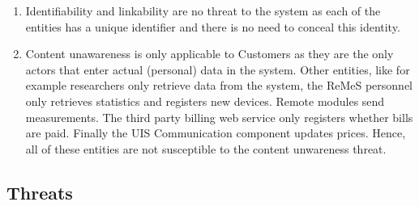 \begin{enumerate}
  \item Identifiability and linkability are no threat to the system as each
  of the entities has a unique identifier and there is no need to conceal this
  identity. 
  \item Content unawareness is only applicable to Customers as they are the only
  actors that enter actual (personal) data in the system. Other entities, like
  for example researchers only retrieve data from the system, the ReMeS
  personnel only retrieves statistics and registers new devices. Remote modules
  send measurements. The third party billing web service only registers whether
  bills are paid. Finally the UIS Communication component updates prices.
  Hence, all of these entities are not susceptible to the content unwareness
  threat.
\end{enumerate}

\subsection{Threats}










